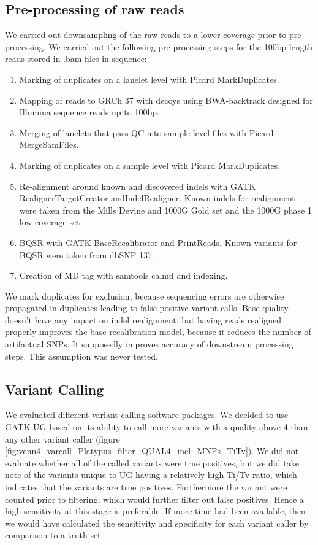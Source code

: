 \subsection{Pre-processing of raw reads}
We carried out downsampling of the raw reads to a lower coverage prior to pre-processing. We carried out the following pre-processing steps for the 100bp length reads stored in .bam files in sequence:
\begin{enumerate}
\item Marking of duplicates on a lanelet level with Picard MarkDuplicates.
\item Mapping of reads to \gls{GRCh} 37 with decoys using BWA-backtrack\cite{Li15072009} designed for Illumina sequence reads up to 100bp.
\item Merging of lanelets that pass \gls{QC} into sample level files with Picard MergeSamFiles.
\item Marking of duplicates on a sample level with Picard MarkDuplicates.
\item Re-alignment around known and discovered indels with GATK RealignerTargetCreator andIndelRealigner. Known indels for realignment were taken from the Mills Devine and 1000G Gold set and the 1000G phase 1 low coverage set.
\item \gls{BQSR} with GATK BaseRecalibrator and PrintReads. Known variants for BQSR were taken from dbSNP 137.
\item Creation of MD tag with samtools calmd and indexing.
\end{enumerate}

We mark duplicates for exclusion, because sequencing errors are otherwise propagated in duplicates leading to false positive variant calls. Base quality doesn't have any impact on indel realignment, but having reads realigned properly improves the base recalibration model, because it reduces the number of artifactual \glspl{SNP}. It supposedly improves accuracy of downstream processing steps. This assumption was never tested.

\subsection{Variant Calling}
We evaluated different variant calling software packages. We decided to use \gls{GATK} \gls{UG} based on its ability to call more variants with a quality above 4 than any other variant caller (figure \ref{fig:venn4_varcall_Platypus_filter_QUAL4_incl_MNPs_TiTv}). We did not evaluate whether all of the called variants were true positives, but we did take note of the variants unique to \gls{UG} having a relatively high Ti/Tv ratio, which indicates that the variants are true positives. Furthermore the variant were counted prior to filtering, which would further filter out false positives. Hence a high sensitivity at this stage is preferable. If more time had been available, then we would have calculated the sensitivity and specificity for each variant caller by comparison to a truth set.

